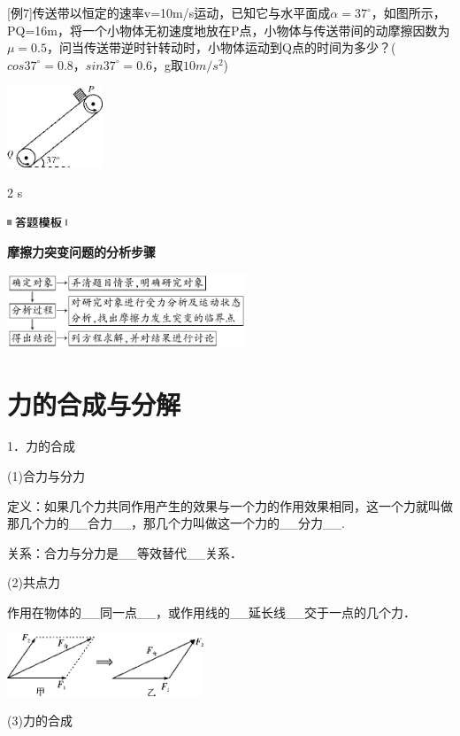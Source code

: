 {[}例7{]}传送带以恒定的速率v=10m/s运动，已知它与水平面成$\alpha=37^\circ$，如图所示，PQ=16m，将一个小物体无初速度地放在P点，小物体与传送带间的动摩擦因数为$\mu=0.5$，问当传送带逆时针转动时，小物体运动到Q点的时间为多少？($cos37^\circ=0.8，sin 37^\circ=0.6$，g取$10 m/s^2$)

\begin{center}\includegraphics[width=1.125in,height=0.95833in]{media/image53.png}\end{center}

\begin{solution}
	2 s
\end{solution}
\begin{center}\includegraphics[width=0.70833in,height=0.125in]{media/image25.png}

\textbf{摩擦力突变问题的分析步骤}
\end{center}


\begin{center}\includegraphics[width=2.8125in,height=0.875in]{media/image54.png}\end{center}
\newpage
\section{力的合成与分解}


1．力的合成

(1)合力与分力

定义：如果几个力共同作用产生的效果与一个力的作用效果相同，这一个力就叫做那几个力的\_\_合力\_\_，那几个力叫做这一个力的\_\_分力\_\_.

关系：合力与分力是\_\_等效替代\_\_关系．

(2)共点力

作用在物体的\_\_同一点\_\_，或作用线的\_\_延长线\_\_交于一点的几个力．

\begin{center}\includegraphics[width=2.3125in,height=0.72917in]{media/image61.png}
	
\end{center}
(3)力的合成

